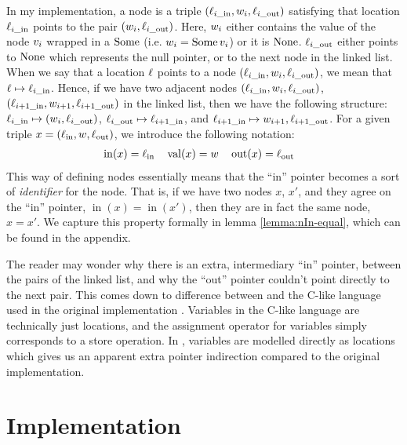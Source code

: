 \documentclass[a4paper, 10pt]{report}
\theoremstyle{definition}
\newcommand{\locin}{\loc_{\mathrm{in}}}
\newcommand{\locinM}[1]{\loc_{#1\_\mathrm{in}}}
\newcommand{\locout}{\loc_{\mathrm{out}}}
\newcommand{\locoutM}[1]{\loc_{#1\_\mathrm{out}}}
\newcommand{\nodeval}{\valB}
\newcommand{\nodevalM}[1]{\nodeval_{#1}}
\newcommand{\nIn}[1]{\operatorname{in}(#1)}
\newcommand{\nVal}[1]{\operatorname{val}(#1)}
\newcommand{\nOut}[1]{\operatorname{out}(#1)}
\newcommand{\node}{x}
\newcommand{\absvalue}{\val}
\begin{document}
In my implementation, a node is a triple $(\locinM{i}, \nodevalM{i}, \locoutM{i})$ satisfying that location $\locinM{i}$ points to the pair $(\nodevalM{i}, \locoutM{i})$. Here, $\nodevalM{i}$ either contains the value of the node $\absvalue_i$ wrapped in a $\operatorname{Some}$ (i.e. $\nodevalM{i} = \Some \absvalue_i$) or it is $\operatorname{None}$. $\locoutM{i}$ either points to $\operatorname{None}$ which represents the null pointer, or to the next node in the linked list. When we say that a location $\ell$ points to a node $(\locinM{i}, \nodevalM{i}, \locoutM{i})$, we mean that $\loc \mapsto \locinM{i}$. Hence, if we have two adjacent nodes $(\locinM{i}, \nodevalM{i}, \locoutM{i})$, $(\locinM{i+1}, \nodevalM{i+1}, \locoutM{i+1})$ in the linked list, then we have the following structure: $\locinM{i} \mapsto (\nodevalM{i}, \locoutM{i})$, $\locoutM{i} \mapsto \locinM{i+1}$, and $\locinM{i+1} \mapsto \nodevalM{i+1}, \locoutM{i+1}$.
For a given triple $\node = (\locin, \nodeval, \locout)$, we introduce the following notation:
\begin{align*}
  &\nIn{\node} = \locin& &\nVal{\node} = \nodeval& &\nOut{\node} = \locout
\end{align*}
This way of defining nodes essentially means that the ``in'' pointer becomes a sort of \textit{identifier} for the node. That is, if we have two nodes $\node$, $\node'$, and they agree on the ``in'' pointer, $\nIn{\node} = \nIn{\node'}$, then they are in fact the same node, $\node = \node'$. We capture this property formally in lemma \ref{lemma:nIn-equal}, which can be found in the appendix.

The reader may wonder why there is an extra, intermediary ``in'' pointer, between the pairs of the linked list, and why the ``out'' pointer couldn't point directly to the next pair. This comes down to difference between \heaplang and the C-like language used in the original implementation \citep{DBLP:conf/podc/MichaelS96}. Variables in the C-like language are technically just locations, and the assignment operator for variables simply corresponds to a store operation. In \heaplang, variables are modelled directly as locations which gives us an apparent extra pointer indirection compared to the original implementation.

\section{Implementation}
\label{TLMSQ:section:implementation}
\end{document}
